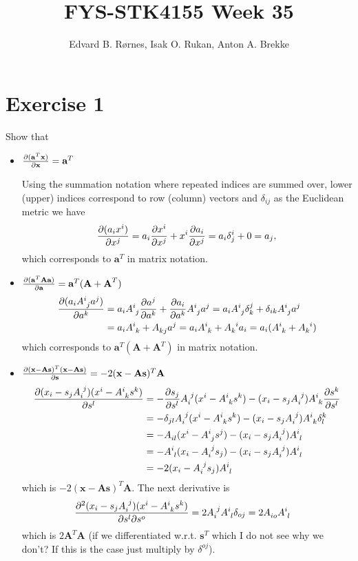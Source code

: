 \documentclass{article}
\title{FYS-STK4155 Week 35}
\author{Edvard B. Rørnes, Isak O. Rukan, Anton A. Brekke}
\newcommand{\p}{\partial}
\begin{document}
	\maketitle
	\section*{Exercise 1}
	Show that
	\begin{itemize}
		\item $\pdv{(\mathbf{a}^T\textbf{x})}{\textbf{x}}=\textbf{a}^T$
		
		Using the summation notation where repeated indices are summed over, lower (upper) indices correspond to row (column) vectors and $\delta_{ij}$ as the Euclidean metric we have
		\begin{align*}
			\pdv{(a_ix^i)}{x^j}=a_i\pdv{x^i}{x^j}+x^i\pdv{a_i}{x^j}=a_i\delta^i_j+0=a_j,
		\end{align*}
		which corresponds to $\textbf{a}^T$ in matrix notation. 
		
		\item $\pdv{(\mathbf{a}^T\textbf{A}\textbf{a})}{\textbf{a}}=\textbf{a}^T(\textbf{A}+\textbf{A}^T)$
		\begin{align*}
			\pdv{(a_i\tensor{A}{^i_j}a^j)}{a^k}&=a_i\tensor{A}{^i_j}\pdv{a^j}{a^k}+\pdv{a_i}{a^k}\tensor{A}{^i_j}a^j=a_i\tensor{A}{^i_j}\delta^j_k+\delta_{ik}\tensor{A}{^i_j}a^j\\
			&=a_i\tensor{A}{^i_k}+\tensor{A}{_k_j}a^j=a_i\tensor{A}{^i_k}+\tensor{A}{_k^i}a_i=a_i(\tensor{A}{^i_k}+\tensor{A}{_k^i})
		\end{align*}
		which corresponds to $\textbf{a}^T(\textbf{A}+\textbf{A}^T)$ in matrix notation.
		
		\item $\pdv{(\textbf{x}-\textbf{As})^T(\textbf{x}-\textbf{As})}{\textbf{s}}=-2(\textbf{x}-\textbf{As})^T\textbf{A}$
		\begin{align*}
			\pdv{(x_i-s_j\tensor{A}{_i^j})(x^i-\tensor{A}{^i_k}s^k)}{s^l}&=-\pdv{s_j}{s^l}\tensor{A}{_i^j}(x^i-\tensor{A}{^i_k}s^k)-(x_i-s_j\tensor{A}{_i^j})\tensor{A}{^i_k}\pdv{s^k}{s^l}\\
			&=-\delta_{jl}\tensor{A}{_i^j}(x^i-\tensor{A}{^i_k}s^k)-(x_i-s_j\tensor{A}{_i^j})\tensor{A}{^i_k}\delta^k_l\\
			&=-\tensor{A}{_i_l}(x^i-\tensor{A}{^i_j}s^j)-(x_i-s_j\tensor{A}{_i^j})\tensor{A}{^i_l}\\
			&=-\tensor{A}{^i_l}(x_i-\tensor{A}{_i^j}s_j)-(x_i-s_j\tensor{A}{_i^j})\tensor{A}{^i_l}\\
			&=-2(x_i-\tensor{A}{_i^j}s_j)\tensor{A}{^i_l}
		\end{align*}
		which is $-2(\textbf{x}-\textbf{As})^T\textbf{A}$. The next derivative is
		\begin{align*}
			\frac{\p^2(x_i-s_j\tensor{A}{_i^j})(x^i-\tensor{A}{^i_k}s^k)}{\p s^l\p s^o}& = 2\tensor{A}{_i^j}\tensor{A}{^i_l}\delta_{oj}=2\tensor{A}{_i_o}\tensor{A}{^i_l}
		\end{align*}
		which is $2\textbf{A}^T\textbf{A}$  (if we differentiated w.r.t. $\textbf{s}^T$ which I do not see why we don't? If this is the case just multiply by $\delta^{oj}$).
	\end{itemize}
	
\end{document}
